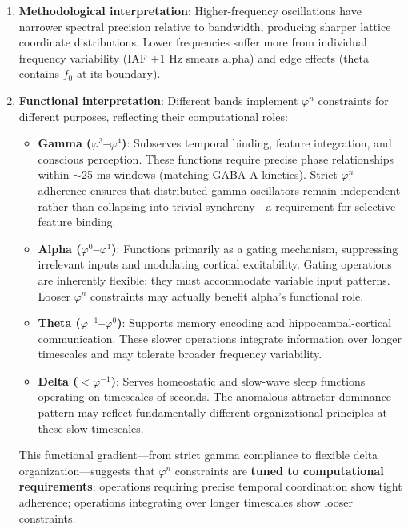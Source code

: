 \documentclass[11pt,a4paper]{article}
\newcommand{\phisym}{\varphi}
\newcommand{\fzero}{f_0}
\begin{document}
\begin{enumerate}
    \item \textbf{Methodological interpretation}: Higher-frequency oscillations have narrower spectral precision relative to bandwidth, producing sharper lattice coordinate distributions. Lower frequencies suffer more from individual frequency variability (IAF $\pm$1 Hz smears alpha) and edge effects (theta contains $\fzero$ at its boundary).

    \item \textbf{Functional interpretation}: Different bands implement $\phisym^n$ constraints for different purposes, reflecting their computational roles:

    \begin{itemize}
        \item \textbf{Gamma ($\phisym^3$--$\phisym^4$)}: Subserves temporal binding, feature integration, and conscious perception. These functions require precise phase relationships within $\sim$25 ms windows (matching GABA-A kinetics). Strict $\phisym^n$ adherence ensures that distributed gamma oscillators remain independent rather than collapsing into trivial synchrony---a requirement for selective feature binding.

        \item \textbf{Alpha ($\phisym^0$--$\phisym^1$)}: Functions primarily as a gating mechanism, suppressing irrelevant inputs and modulating cortical excitability. Gating operations are inherently flexible: they must accommodate variable input patterns. Looser $\phisym^n$ constraints may actually benefit alpha's functional role.

        \item \textbf{Theta ($\phisym^{-1}$--$\phisym^0$)}: Supports memory encoding and hippocampal-cortical communication. These slower operations integrate information over longer timescales and may tolerate broader frequency variability.

        \item \textbf{Delta ($<\phisym^{-1}$)}: Serves homeostatic and slow-wave sleep functions operating on timescales of seconds. The anomalous attractor-dominance pattern may reflect fundamentally different organizational principles at these slow timescales.
    \end{itemize}

    This functional gradient---from strict gamma compliance to flexible delta organization---suggests that $\phisym^n$ constraints are \textbf{tuned to computational requirements}: operations requiring precise temporal coordination show tight adherence; operations integrating over longer timescales show looser constraints.
\end{enumerate}
\end{document}
